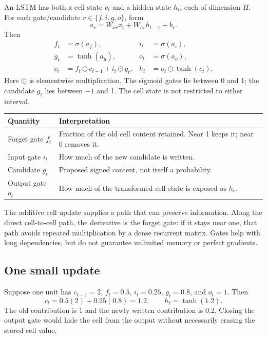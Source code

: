 \documentclass[11pt]{article}
\begin{document}
An LSTM has both a cell state $c_t$ and a hidden state $h_t$, each of dimension $H$. For each gate/candidate $r\in\{f,i,g,o\}$, form
\[
a_r=W_{xr}x_t+W_{hr}h_{t-1}+b_r.
\]
Then
\[
\begin{aligned}
f_t&=\sigma(a_f), & i_t&=\sigma(a_i),\\
g_t&=\tanh(a_g), & o_t&=\sigma(a_o),\\
c_t&=f_t\odot c_{t-1}+i_t\odot g_t,&
h_t&=o_t\odot\tanh(c_t).
\end{aligned}
\]
Here $\odot$ is elementwise multiplication. The sigmoid gates lie between 0 and 1; the candidate $g_t$ lies between $-1$ and 1. The cell state is not restricted to either interval.

\begin{longtable}{@{}P{.21\textwidth}P{.69\textwidth}@{}}
\toprule Quantity & Interpretation\\\midrule\endhead
Forget gate $f_t$ & Fraction of the old cell content retained. Near 1 keeps it; near 0 removes it.\\
Input gate $i_t$ & How much of the new candidate is written.\\
Candidate $g_t$ & Proposed signed content, not itself a probability.\\
Output gate $o_t$ & How much of the transformed cell state is exposed as $h_t$.\\\bottomrule
\end{longtable}
The additive cell update supplies a path that can preserve information. Along the direct cell-to-cell path, the derivative is the forget gate: if it stays near one, that path avoids repeated multiplication by a dense recurrent matrix. Gates help with long dependencies, but do not guarantee unlimited memory or perfect gradients.

\subsection{One small update}
Suppose one unit has $c_{t-1}=2$, $f_t=0.5$, $i_t=0.25$, $g_t=0.8$, and $o_t=1$. Then
\[
c_t=0.5(2)+0.25(0.8)=1.2,\qquad h_t=\tanh(1.2).
\]
The old contribution is 1 and the newly written contribution is 0.2. Closing the output gate would hide the cell from the output without necessarily erasing the stored cell value.
\end{document}
